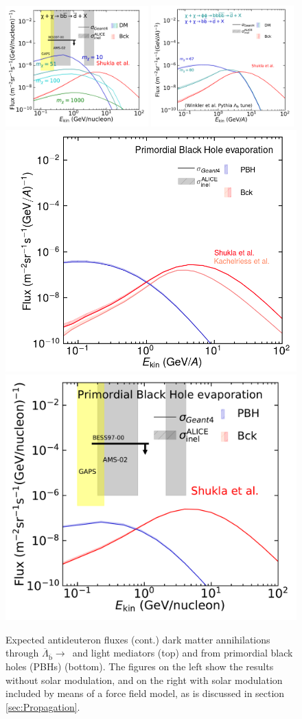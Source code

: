 \begin{figure}\ContinuedFloat
    \centering
    \includegraphics[width=0.49\textwidth]{figures/antideuteron_TOA_bb.pdf}
    \includegraphics[width=0.49\textwidth]{figures/antideuteron_lambdaB_LIS.pdf}
    \includegraphics[width=.49\textwidth]{figures/antideuteron_fluxes_PBH_LIS.png}
    \includegraphics[width=.49\textwidth]{figures/antideuteron_TOA_PBH.pdf}
    \caption{Expected antideuteron fluxes (cont.) dark matter annihilations through $\overline{\Lambda}_{\mathrm{\overline{b}}} \rightarrow $\bb\ and light mediators (top) and from primordial black holes (PBHs) (bottom). The figures on the left show the results without solar modulation, and on the right with solar modulation included by means of a force field model, as is discussed in section \ref{sec:Propagation}.}
    \label{fig:Results_dbar_fluxes_diff_DM_masses}
\end{figure}

